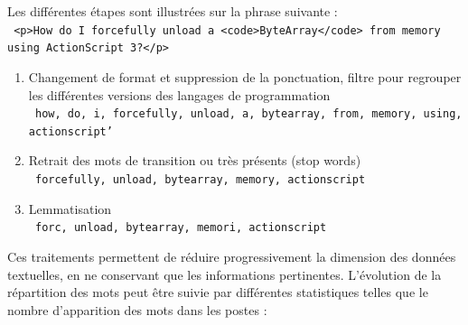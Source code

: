\documentclass[a4paper,11pt]{article}
\begin{document}
Les différentes étapes sont illustrées sur la phrase suivante :\\
{\small \centering \centering
    \texttt{%
    <p>How do I forcefully unload a <code>ByteArray</code> from memory using ActionScript 3?</p>}
}
\begin{enumerate}
    \item Changement de format et suppression de la ponctuation, filtre pour regrouper les différentes versions des langages de programmation\\
        {\small \centering
        \texttt{%
        how, do, i, forcefully, unload, a, bytearray, from, memory, using, actionscript'}
        }
    \item Retrait des mots de transition ou très présents (stop words)\\
        {\small \centering
        \texttt{%
        forcefully, unload, bytearray, memory, actionscript}
        }
    \item Lemmatisation\\
        {\small \centering
        \texttt{%
        forc, unload, bytearray, memori, actionscript}
        }
\end{enumerate}

Ces traitements permettent de réduire progressivement la dimension des données textuelles, en ne conservant que les informations pertinentes. L'évolution de la répartition des mots peut être suivie par différentes statistiques telles que le nombre d'apparition des mots dans les postes : \\
\end{document}
